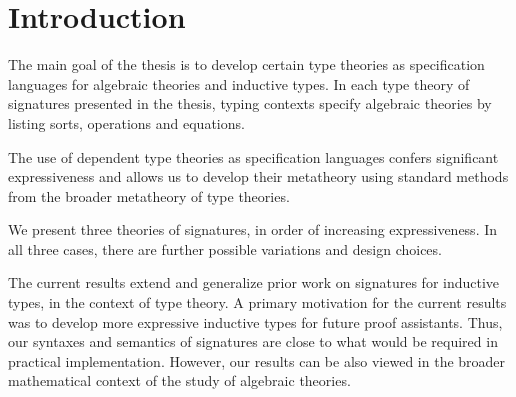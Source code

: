 \documentclass[12pt]{article}
\begin{document}
\section{Introduction}

The main goal of the thesis is to develop certain type theories as specification
languages for algebraic theories and inductive types. In each type theory of
signatures presented in the thesis, typing contexts specify algebraic theories
by listing sorts, operations and equations.

The use of dependent type theories as specification languages confers
significant expressiveness and allows us to develop their metatheory using
standard methods from the broader metatheory of type theories.

We present three theories of signatures, in order of increasing expressiveness.
In all three cases, there are further possible variations and design choices.

The current results extend and generalize prior work on signatures for inductive
types, in the context of type theory. A primary motivation for the current
results was to develop more expressive inductive types for future proof
assistants. Thus, our syntaxes and semantics of signatures are close to what
would be required in practical implementation. However, our results can be also
viewed in the broader mathematical context of the study of algebraic theories.



\end{document}
